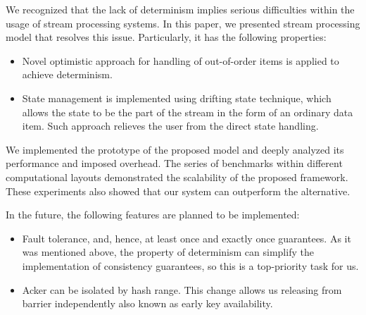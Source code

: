 
\label {fs-conclusions}

We recognized that the lack of determinism implies serious difficulties within the usage of stream processing systems. In this paper, we presented stream processing model that resolves this issue. Particularly, it has the following properties:

\begin{itemize}
    \item Novel optimistic approach for handling of out-of-order items is applied to achieve determinism.
    \item State management is implemented using drifting state technique, which allows the state to be the part of the stream in the form of an ordinary data item. Such approach relieves the user from the direct state handling.
\end{itemize}

We implemented the prototype of the proposed model and deeply analyzed its performance and imposed overhead. The series of benchmarks within different computational layouts demonstrated the scalability of the proposed framework. These experiments also showed that our system can outperform the alternative.

In the future, the following features are planned to be implemented:
\begin{itemize}
    \item Fault tolerance, and, hence, at least once and exactly once guarantees. As it was mentioned above, the property of determinism can simplify the implementation of consistency guarantees, so this is a top-priority task for us.
    \item Acker can be isolated by hash range. This change allows us releasing from barrier independently also known as early key availability.
\end{itemize}

